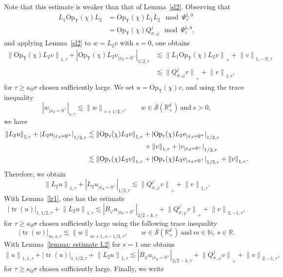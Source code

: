 \documentclass[10pt]{amsart}
\theoremstyle{plain}
\theoremstyle{definition}
\def\R{\mathbb{R}}
\def\N{\mathbb{N}}
\newcommand{\suff}{sufficiently\xspace}
\let\k\kappa
\newcommand{\br}{\ensuremath{_{|x_d=0^+}}}
\newcommand{\Opt}{\ensuremath{\mathrm{Op}_{\scriptscriptstyle{\mathsf{T}}}}}
\newcommand{\Norm}[2]{{\| #1 \|}_{#2}}
\newcommand{\Normsc}[2]{{\| #1 \|}_{#2, \tau}}
\newcommand{\normsc}[2]{{| #1 |}_{#2, \tau}}
\newcommand{\bignormsc}[2]{{\big| #1 \big|}_{#2, \tau}}
\newcommand{\Psisc}{\Psi_\tau}
\newcommand{\Qconj}{Q_{\sigma,\varphi}}
\newcommand{\Sbarp}{\ensuremath{\overline{\mathscr{S}}(\Rdp)}}
\newcommand{\Rdp}{\R^d_+}
\DeclareMathOperator{\trace}{tr}
\begin{document}
Note that this estimate is weaker than that of Lemma~\ref{sl2}.
Observing that
\begin{align*}
L_1 \Opt(\chi)L_2 &=\Opt(\chi)L_1 L_2 \mod \Psisc^{1,0}\\
&= \Opt(\chi)\Qconj^j \mod \Psisc^{1,0},
\end{align*}
and applying Lemma~\ref{sl2} to $w=L_2 v$ with $s=0$, one obtains
\begin{align*}
\Normsc{\Opt(\chi) L_2 v}{1}
+ \normsc{\Opt(\chi) L_2 v\br}{1/2}
& \lesssim \Norm{L_1 \Opt(\chi) L_2 v}{+}
+\Normsc{v}{1,-N}\\
& \lesssim \Norm{\Qconj^jv}{+}
+\Normsc{v}{1},
\end{align*}
for $\tau \geq \k_0 \sigma$ chosen \suff large.
We set $u=\Opt(\chi)v$, and using the trace inequality
\begin{equation*}
\normsc{w\br}{s}\lesssim \Normsc{w}{s+1/2},
\qquad w\in
\Sbarp \ \text{and} \ s>0,
\end{equation*}
we have
\begin{align*}
\Normsc{L_2 u}{1}+
\normsc{L_2 u\br}{1/2}
&\lesssim \Normsc{\Opt(\chi) L_2 v}{1}
+ \normsc{\Opt(\chi)L_2 v\br}{1/2}\\
&\hspace*{2.93cm} + \Normsc{v}{1} +\normsc{v\br}{1/2}\\
&\lesssim \Normsc{\Opt(\chi) L_2 v}{1} + \normsc{\Opt(\chi)L_2
v\br}{1/2} + \Normsc{v}{1}.
\end{align*}
Therefore, we obtain
\begin{equation*}
\Normsc{L_2 u}{1}+ \normsc{L_2 u\br}{1/2}
\lesssim \Norm{\Qconj^jv}{+}
+\Normsc{v}{1}.
\end{equation*}
With Lemma~\ref{lr1}, one has the estimate
\begin{equation*}
\bignormsc{\trace (u)}{1,1/2} + \Normsc{L_2 u}{1}
\lesssim
\normsc{B_{\varphi}u\br}{3/2-k}
+ \Norm{\Qconj^jv}{+}
+\Normsc{v}{2,-1},
\end{equation*}
for $\tau \geq \k_0 \sigma$ chosen \suff large
using the following trace inequality
\begin{equation*}
\normsc{\trace(w)}{m,s}
\lesssim \Normsc{w}{m+1,s-1/2},
\qquad w\in \Sbarp \ \text{and} \ m\in\N, \
s\in\R.
\end{equation*}
With Lemma~\ref{lemma: estimate L2} for $s=1$ one obtains
\[
\Normsc{u}{1,1} + \bignormsc{\trace (u)}{1,1/2} + \Normsc{L_2 u}{1}
\lesssim
\normsc{B_{\varphi}u\br}{3/2-k}
+ \Norm{\Qconj^jv}{+}
+\Normsc{v}{2,-1},
\]
for $\tau \geq \k_0 \sigma$ chosen \suff large.
Finally, we write
\end{document}
